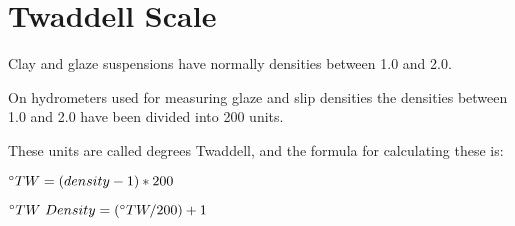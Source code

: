 \chapter{Twaddell Scale}
\label{sec:twaddellscale}
Clay and glaze suspensions have normally densities between 1.0 and 2.0. 

On hydrometers used for measuring glaze and slip densities the densities 
between 1.0 and 2.0 have been divided into 200 units. 

These units are called degrees Twaddell, and the formula for calculating these 
is:

$\degree TW=(density-1)*200$

$\degree TW~Density=(\degree TW/200)+1$
